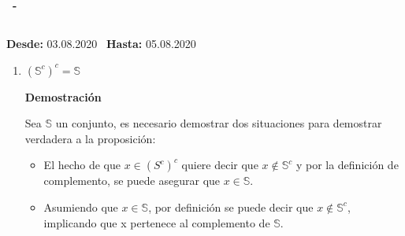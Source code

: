 \documentclass[a4paper,dvipsnames]{book}
\newcommand{\np}{\null\newpage}
\newenvironment{tarea}[3]
    {
        \null\newpage
        \begin{tcolorbox}
            \textbf{\asignatura\ -\ \autor}
            \subsection{\capitalisewords{#1}}

            \begin{flushright}
            \textbf{Desde:}  #2 \
            \textbf{Hasta:}  #3 \
            \end{flushright}
        \end{tcolorbox}

    \begin{enumerate}[{Ejercicio} 1.]
    }
    {
        \end{enumerate}
        \np
    }
\begin{document}
\begin{tarea}{Tarea Demostración de Lemas}{03.08.2020}{05.08.2020}
\begin{enumerate}
                    \begin{itemize}
                        \item Si $x\in\left( \mathbb S\cap\left( \mathbb
                            T\cup\mathbb U \right) \right)$ significa que
                            $x\in\mathbb S$ y también que $x\in\left( \mathbb
                            T\cup\mathbb U \right)$ es decir, que
                            incondicionalmente $x\in\mathbb S$ pero también
                            $x\in\mathbb T$ ó $x\in\mathbb U$. Por lo tanto se
                            puede decir que $x\in\left( \left( \mathbb
                            S\cap\mathbb T \right)\cup\left( \mathbb
                            S\cap\mathbb U\right) \right)$.
                        \item Por otro lado hay que asumir que $x\in\left(
                            \left( \mathbb S\cap\mathbb T\right)\cup\left(
                            \mathbb S\cap\mathbb U\right) \right)$, lo que
                            significa que ó $x\in\left( \mathbb S\cap\mathbb T
                            \right)$ ó $x\in\left( \mathbb S\cap\mathbb U
                            \right)$. A partir de lo anterior se puede asegurar
                            que $x\in\mathbb S$ y que $x\in\mathbb T$ ó
                            $x\in\mathbb U$, que es lo mismo que decir
                            $x\in\left( \mathbb S\cap\left( \mathbb
                            T\cup\mathbb U \right) \right)$
                    \end{itemize}

                    Ya que se cumplen ambas condiciones, se puede concluir que
                    la proposición es verdadera. $\blacksquare$

                \item $(\mathbb S^{c})^{c} = \mathbb S$

                \textbf{Demostración}

                Sea $\mathbb S$ un conjunto, es necesario demostrar dos
                situaciones para demostrar verdadera a la proposición:

                \begin{itemize}
                    \item El hecho de que $x\in(S^{c})^{c}$ quiere decir que
                        $x\notin\mathbb S^{c}$ y por la definición de
                        complemento, se puede asegurar que $x\in\mathbb S$.
                    \item Asumiendo que $x\in\mathbb S$, por definición se
                        puede decir que $x\notin\mathbb S^{c}$, implicando que
                        x pertenece al complemento de $\mathbb S$.
                \end{itemize}


\end{enumerate}
\end{tarea}
\end{document}
